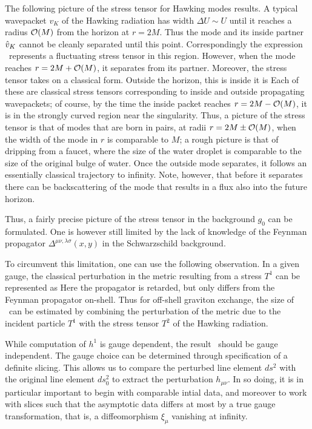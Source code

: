 The following picture of the stress tensor for Hawking modes results.  A typical wavepacket $v_K$ of the Hawking radiation has width $\Delta U\sim U$ until it reaches a radius ${\cal O}(M)$ from the horizon at $r=2M$.  Thus the mode and its inside partner ${\hat v}_K$ cannot be cleanly separated until this point.  Correspondingly the expression \onestress\ represents a  fluctuating stress tensor in this region.  However, when the mode reaches $r= 2M + {\cal O}(M)$, it separates from its partner.  Moreover, the stress tensor takes on a classical form.  Outside the horizon, this is
%
\eqn{}
%
inside it is
%
\eqn{}
%
Each of these are classical stress tensors corresponding to inside and outside propagating wavepackets; of course, by the time the inside packet reaches $r= 2M - {\cal O}(M)$, it is in the strongly curved region near the singularity.  Thus, a picture of the stress tensor is that of modes that are born in pairs, at radii $r= 2M \pm {\cal O}(M)$, when the width of the mode in $r$ is comparable to $M$; a rough picture is that of dripping from a faucet, where the size of the water droplet is comparable to the size of the original bulge of water.  Once the outside mode separates, it follows an essentially classical trajectory to infinity.  Note, however, that before it separates there can be backscattering of the mode that results in a flux also into the future horizon.

Thus, a fairly precise picture of the stress tensor in the background $g_0$ can be formulated.  One is however still limited by the lack of knowledge of the Feynman propagator $\Delta^{\mu\nu,\lambda\sigma}(x,y)$ in the Schwarzschild background.   


To circumvent this limitation, one can use the following observation.  In a given gauge, the classical perturbation in the metric resulting from a stress $T^1$ can be represented as
%
\eqn{}
%
Here the propagator is retarded, but only differs from the Feynman propagator on-shell.  Thus for off-shell graviton exchange, the size of \treeM\ can be estimated by combining the perturbation of the metric due to the incident particle $T^1$ with the stress tensor $T^2$ of the Hawking radiation.  


While computation of $h^1$ is gauge dependent, the result \treeM\ should be gauge independent.  The gauge choice can be determined through specification of a definite slicing.  This allows us to compare the perturbed line element $ds^2$ with the original line element $ds_0^2$ to extract the perturbation $h_{\mu\nu}$.  In so doing, it is in particular important to begin with comparable intial data, and moreover to work with slices such that the asymptotic data differs at most by a true gauge transformation, that is, a diffeomorphism $\xi_\mu$ vanishing at infinity.

